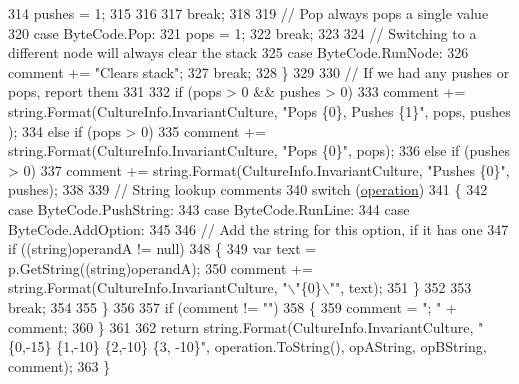 \begin{DoxyCode}
314                         pushes = 1;
315 
316 
317                     \textcolor{keywordflow}{break};
318 
319                 \textcolor{comment}{// Pop always pops a single value}
320                 \textcolor{keywordflow}{case} ByteCode.Pop:
321                     pops = 1;
322                     \textcolor{keywordflow}{break};
323 
324                 \textcolor{comment}{// Switching to a different node will always clear the stack}
325                 \textcolor{keywordflow}{case} ByteCode.RunNode:
326                     comment += \textcolor{stringliteral}{"Clears stack"};
327                     \textcolor{keywordflow}{break};
328             \}
329 
330             \textcolor{comment}{// If we had any pushes or pops, report them}
331 
332             \textcolor{keywordflow}{if} (pops > 0 && pushes > 0)
333                 comment += string.Format(CultureInfo.InvariantCulture, \textcolor{stringliteral}{"Pops \{0\}, Pushes \{1\}"}, pops, pushes
      );
334             \textcolor{keywordflow}{else} \textcolor{keywordflow}{if} (pops > 0)
335                 comment += string.Format(CultureInfo.InvariantCulture, \textcolor{stringliteral}{"Pops \{0\}"}, pops);
336             \textcolor{keywordflow}{else} \textcolor{keywordflow}{if} (pushes > 0)
337                 comment += string.Format(CultureInfo.InvariantCulture, \textcolor{stringliteral}{"Pushes \{0\}"}, pushes);
338 
339             \textcolor{comment}{// String lookup comments}
340             \textcolor{keywordflow}{switch} (\hyperlink{a00119_a566bf5f7198cc353ea5c3710cb3a31cb}{operation})
341             \{
342                 \textcolor{keywordflow}{case} ByteCode.PushString:
343                 \textcolor{keywordflow}{case} ByteCode.RunLine:
344                 \textcolor{keywordflow}{case} ByteCode.AddOption:
345 
346                     \textcolor{comment}{// Add the string for this option, if it has one}
347                     \textcolor{keywordflow}{if} ((\textcolor{keywordtype}{string})operandA != null)
348                     \{
349                         var text = p.GetString((string)operandA);
350                         comment += string.Format(CultureInfo.InvariantCulture, \textcolor{stringliteral}{"\(\backslash\)"\{0\}\(\backslash\)""}, text);
351                     \}
352 
353                     \textcolor{keywordflow}{break};
354 
355             \}
356 
357             \textcolor{keywordflow}{if} (comment != \textcolor{stringliteral}{""})
358             \{
359                 comment = \textcolor{stringliteral}{"; "} + comment;
360             \}
361 
362             \textcolor{keywordflow}{return} string.Format(CultureInfo.InvariantCulture, \textcolor{stringliteral}{"\{0,-15\} \{1,-10\} \{2,-10\} \{3, -10\}"}, 
      operation.ToString(), opAString, opBString, comment);
363         \}
\end{DoxyCode}


